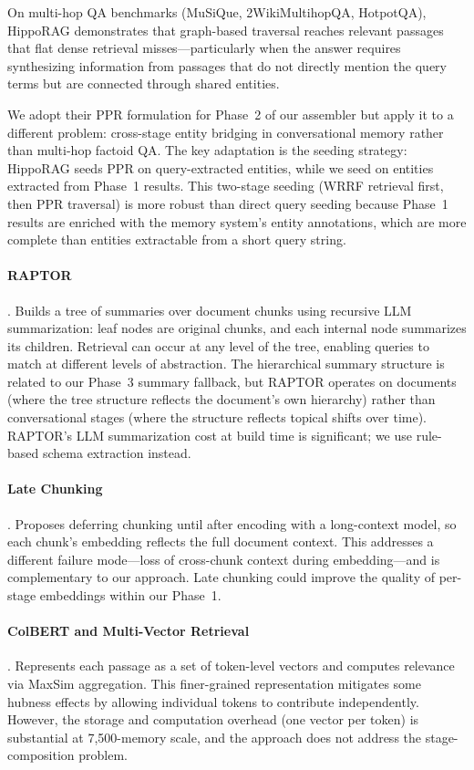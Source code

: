 \documentclass[11pt]{article}
\begin{document}
On multi-hop QA benchmarks (MuSiQue, 2WikiMultihopQA, HotpotQA),
HippoRAG demonstrates that graph-based traversal reaches relevant
passages that flat dense retrieval misses---particularly when the
answer requires synthesizing information from passages that do not
directly mention the query terms but are connected through shared
entities.

We adopt their PPR formulation for Phase~2 of our assembler but
apply it to a different problem: cross-stage entity bridging in
conversational memory rather than multi-hop factoid QA.  The key
adaptation is the seeding strategy: HippoRAG seeds PPR on
query-extracted entities, while we seed on entities extracted from
Phase~1 results.  This two-stage seeding (WRRF retrieval first, then
PPR traversal) is more robust than direct query seeding because
Phase~1 results are enriched with the memory system's entity
annotations, which are more complete than entities extractable from
a short query string.

\paragraph{RAPTOR} \citep{Sarthi2024}.
Builds a tree of summaries over document chunks using recursive LLM
summarization: leaf nodes are original chunks, and each internal node
summarizes its children.  Retrieval can occur at any level of the
tree, enabling queries to match at different levels of abstraction.
The hierarchical summary structure is related to our Phase~3 summary
fallback, but RAPTOR operates on documents (where the tree structure
reflects the document's own hierarchy) rather than conversational
stages (where the structure reflects topical shifts over time).
RAPTOR's LLM summarization cost at build time is significant; we use
rule-based schema extraction instead.

\paragraph{Late Chunking} \citep{JinaAI2025}.
Proposes deferring chunking until after encoding with a long-context
model, so each chunk's embedding reflects the full document context.
This addresses a different failure mode---loss of cross-chunk context
during embedding---and is complementary to our approach.  Late
chunking could improve the quality of per-stage embeddings within our
Phase~1.

\paragraph{ColBERT and Multi-Vector Retrieval} \citep{Khattab2020}.
Represents each passage as a set of token-level vectors and computes
relevance via MaxSim aggregation.  This finer-grained representation
mitigates some hubness effects by allowing individual tokens to
contribute independently.  However, the storage and computation
overhead (one vector per token) is substantial at 7,500-memory scale,
and the approach does not address the stage-composition problem.
\end{document}
